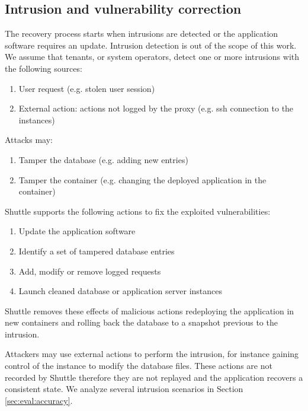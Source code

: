 \subsection{Intrusion and vulnerability correction}
\label{sec:arch:detection}
The recovery process starts when intrusions are detected or the application software requires an update. Intrusion detection is out of the scope of this work. We assume that tenants, or system operators, detect one or more intrusions with the following sources:

\begin{enumerate}
\item User request (e.g. stolen user session)
\item External action: actions not logged by the proxy (e.g. ssh connection to the instances)
\end{enumerate}

Attacks may:
\begin{enumerate}
\item Tamper the database (e.g. adding new entries)
\item Tamper the container (e.g. changing the deployed application in the container)
\end{enumerate}

Shuttle supports the following actions to fix the exploited vulnerabilities:
\begin{enumerate}
\item Update the application software
\item Identify a set of tampered database entries
\item Add, modify or remove logged requests
\item Launch cleaned database or application server instances
\end{enumerate} 

Shuttle removes these effects of malicious actions redeploying the application in new containers and rolling back the database to a snapshot previous to the intrusion.

Attackers may use external actions to perform the intrusion, for instance gaining control of the instance to modify the database files. These actions are not recorded by Shuttle therefore they are not replayed and the application recovers a consistent state. We analyze several intrusion scenarios in Section \ref{sec:eval:accuracy}.\\



